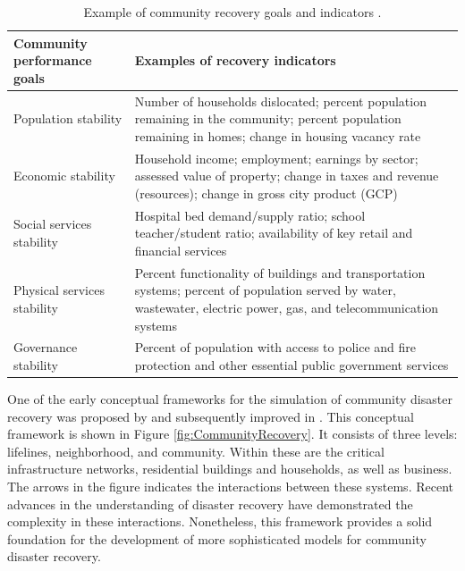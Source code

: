 \begin{table}[tbh]
    \centering
    \caption{Example of community recovery goals and indicators \citep{kwasinski2016conceptual,cutter2013disaster}.}
    \begin{tabularx}{\textwidth}{|l|X|}
    \toprule
    \textbf{Community performance goals} & \textbf{Examples of recovery indicators} \\ \midrule
    
    Population stability & Number of households dislocated; percent population remaining in the community; percent population remaining in homes; change in housing vacancy rate \\ \midrule
    
    Economic stability & Household income; employment; earnings by sector; assessed value of property; change in taxes and revenue (resources); change in gross city product (GCP) \\ \midrule
    
    Social services stability  & Hospital bed demand/supply ratio; school teacher/student ratio; availability of key retail and financial services \\ \midrule
    
    Physical services stability & Percent functionality of buildings and transportation systems; percent of population served by water, wastewater, electric power, gas, and telecommunication systems \\ \midrule
    
    Governance stability & Percent of population with access to police and fire protection and other essential public government services \\ 
    
    \bottomrule

    \end{tabularx}
    \label{tab:CommunityResilienceIndicators}
\end{table}

One of the early conceptual frameworks for the simulation of community disaster recovery was proposed by \cite{miles2003urban} and subsequently improved in \cite{Miles2006}. This conceptual framework is shown in Figure \ref{fig:CommunityRecovery}. It consists of three levels: lifelines, neighborhood, and community. Within these are the critical infrastructure networks, residential buildings and households, as well as business. The arrows in the figure indicates the interactions between these systems. Recent advances in the understanding of disaster recovery \citep{miles2019community} have demonstrated the complexity in these interactions. Nonetheless, this framework provides a solid foundation for the development of more sophisticated models for community disaster recovery. \ 

